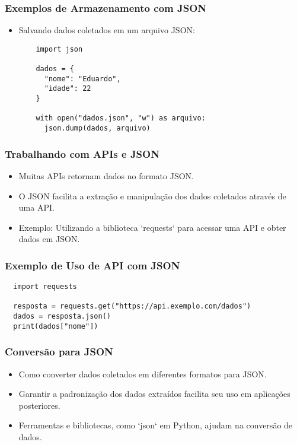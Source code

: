 \documentclass{beamer}
\begin{document}
\begin{frame}[fragile]
  \frametitle{Exemplos de Armazenamento com JSON}
  \begin{itemize}
    \item Salvando dados coletados em um arquivo JSON:
    \begin{verbatim}
    import json

    dados = {
      "nome": "Eduardo",
      "idade": 22
    }

    with open("dados.json", "w") as arquivo:
      json.dump(dados, arquivo)
    \end{verbatim}
  \end{itemize}
\end{frame}

\begin{frame}
  \frametitle{Trabalhando com APIs e JSON}
  \begin{itemize}
    \item Muitas APIs retornam dados no formato JSON.
    \item O JSON facilita a extração e manipulação dos dados coletados através de uma API.
    \item Exemplo: Utilizando a biblioteca `requests` para acessar uma API e obter dados em JSON.
  \end{itemize}
\end{frame}

\begin{frame}[fragile]
  \frametitle{Exemplo de Uso de API com JSON}
  \begin{verbatim}
  import requests

  resposta = requests.get("https://api.exemplo.com/dados")
  dados = resposta.json()
  print(dados["nome"])
  \end{verbatim}
\end{frame}

\begin{frame}
  \frametitle{Conversão para JSON}
  \begin{itemize}
    \item Como converter dados coletados em diferentes formatos para JSON.
    \item Garantir a padronização dos dados extraídos facilita seu uso em aplicações posteriores.
    \item Ferramentas e bibliotecas, como `json` em Python, ajudam na conversão de dados.
  \end{itemize}
\end{frame}
\end{document}
